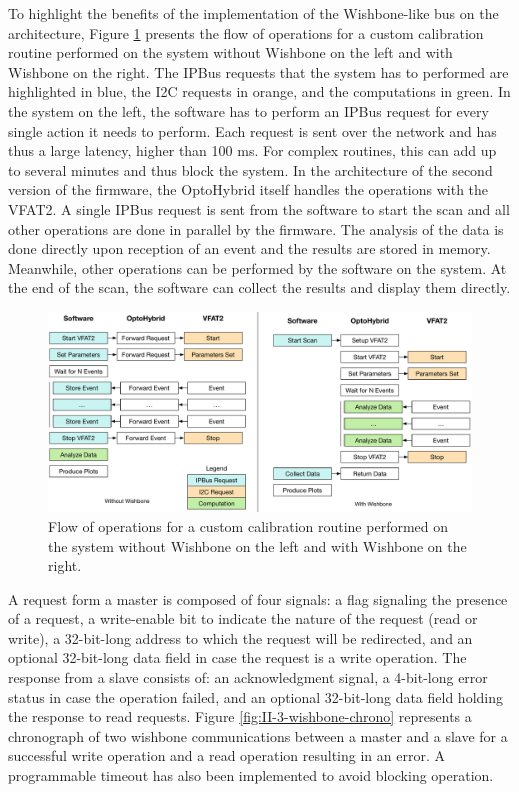       To highlight the benefits of the implementation of the Wishbone-like bus on the architecture, Figure \ref{fig:II-3-wishbone-flow} presents the flow of operations for a custom calibration routine performed on the system without Wishbone on the left and with Wishbone on the right. The IPBus requests that the system has to performed are highlighted in blue, the I2C requests in orange, and the computations in green. In the system on the left, the software has to perform an IPBus request for every single action it needs to perform. Each request is sent over the network and has thus a large latency, higher than 100 ms. For complex routines, this can add up to several minutes and thus block the system. In the architecture of the second version of the firmware, the OptoHybrid itself handles the operations with the VFAT2. A single IPBus request is sent from the software to start the scan and all other operations are done in parallel by the firmware. The analysis of the data is done directly upon reception of an event and the results are stored in memory. Meanwhile, other operations can be performed by the software on the system. At the end of the scan, the software can collect the results and display them directly. \\

      \begin{figure}[h!]
        \centering
        \includegraphics[width=\textwidth]{img/II-3-test-beam/wishbone_flow}
        \caption{Flow of operations for a custom calibration routine performed on the system without Wishbone on the left and with Wishbone on the right.}
        \label{fig:II-3-wishbone-flow}
      \end{figure}


      A request form a master is composed of four signals: a flag signaling the presence of a request, a write-enable bit to indicate the nature of the request (read or write), a 32-bit-long address to which the request will be redirected, and an optional 32-bit-long data field in case the request is a write operation. The response from a slave consists of: an acknowledgment signal, a 4-bit-long error status in case the operation failed, and an optional 32-bit-long data field holding the response to read requests. Figure \ref{fig:II-3-wishbone-chrono} represents a chronograph of two wishbone communications between a master and a slave for a successful write operation and a read operation resulting in an error. A programmable timeout has also been implemented to avoid blocking operation.  \\

